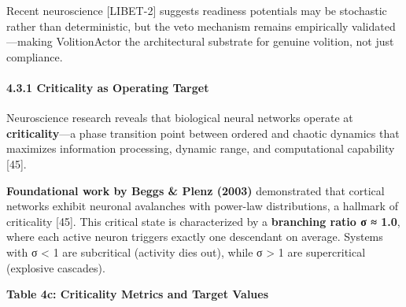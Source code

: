 \documentclass[
  11pt,
]{article}
\begin{document}
Recent neuroscience {[}LIBET-2{]} suggests readiness potentials may be
stochastic rather than deterministic, but the veto mechanism remains
empirically validated---making VolitionActor the architectural substrate
for genuine volition, not just compliance.

\paragraph{4.3.1 Criticality as Operating
Target}\label{criticality-as-operating-target}

Neuroscience research reveals that biological neural networks operate at
\textbf{criticality}---a phase transition point between ordered and
chaotic dynamics that maximizes information processing, dynamic range,
and computational capability {[}45{]}.

\textbf{Foundational work by Beggs \& Plenz (2003)} demonstrated that
cortical networks exhibit neuronal avalanches with power-law
distributions, a hallmark of criticality {[}45{]}. This critical state
is characterized by a \textbf{branching ratio σ ≈ 1.0}, where each
active neuron triggers exactly one descendant on average. Systems with σ
\textless{} 1 are subcritical (activity dies out), while σ
\textgreater{} 1 are supercritical (explosive cascades).

\textbf{Table 4c: Criticality Metrics and Target Values}
\end{document}
